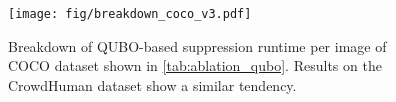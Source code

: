 \begin{figure}
    \centering
    \texttt{[image: fig/breakdown\_coco\_v3.pdf]}
    \caption{Breakdown of QUBO-based suppression runtime per image of COCO dataset shown in \cref{tab:ablation_qubo}. Results on the CrowdHuman dataset show a similar tendency.}
    \label{fig:breakdown_coco}
\end{figure}
